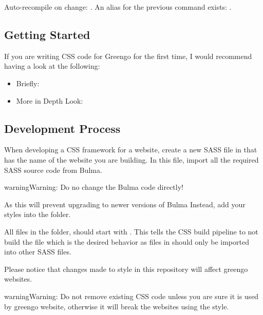 \documentclass[letterpaper,10pt,english]{sphinxmanual}
\begin{document}
Auto-recompile on change: .
An alias for the previous command exists: .


\subsection{Getting Started}
\label{\detokenize{websites/css:getting-started}}
If you are writing CSS code for Greengo for the first time, I would recommend having a look at the following:
\begin{itemize}
\item {} 
Briefly: 

\item {} 
More in Depth Look: 

\end{itemize}


\subsection{Development Process}
\label{\detokenize{websites/css:development-process}}
When developing a CSS framework for a website, create a new SASS file in  that has the name of the website you are building.
In this file, import all the required SASS source code from Bulma.

\begin{sphinxadmonition}{warning}{Warning:}
Do no change the Bulma code directly!

As this will prevent upgrading to newer versions of Bulma
Instead, add your styles into the  folder.
\end{sphinxadmonition}

All files in the  folder, should start with \sphinxcode{\sphinxupquote{\_}}.
This tells the CSS build pipeline to not build the file which is the desired behavior as files in  should only be imported into other SASS files.

Please notice that changes made to style in this repository will affect  greengo websites.

\begin{sphinxadmonition}{warning}{Warning:}
Do not remove existing CSS code unless you are sure it is used by  greengo website, otherwise it will break the websites using the style.
\end{sphinxadmonition}
\end{document}

